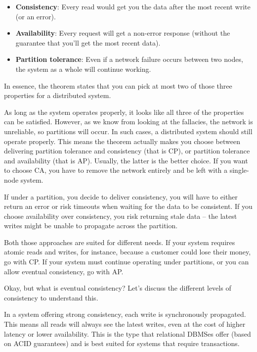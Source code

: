 \begin{itemize}
\item 
\textbf{Consistency}: Every read would get you the data after the most recent write (or an error).

\item 
\textbf{Availability}: Every request will get a non-error response (without the guarantee that you'll get the most recent data).

\item 
\textbf{Partition tolerance}: Even if a network failure occurs between two nodes, the system as a whole will continue working.
\end{itemize}

In essence, the theorem states that you can pick at most two of those three properties for a distributed system.

As long as the system operates properly, it looks like all three of the properties can be satisfied. However, as we know from looking at the fallacies, the network is unreliable, so partitions will occur. In such cases, a distributed system should still operate properly. This means the theorem actually makes you choose between delivering partition tolerance and consistency (that is CP), or partition tolerance and availability (that is AP). Usually, the latter is the better choice. If you want to choose CA, you have to remove the network entirely and be left with a single-node system.

If under a partition, you decide to deliver consistency, you will have to either return an error or risk timeouts when waiting for the data to be consistent. If you choose availability over consistency, you risk returning stale data – the latest writes might be unable to propagate across the partition.

Both those approaches are suited for different needs. If your system requires atomic reads and writes, for instance, because a customer could lose their money, go with CP. If your system must continue operating under partitions, or you can allow eventual consistency, go with AP.

Okay, but what is eventual consistency? Let's discuss the different levels of consistency to understand this.

In a system offering strong consistency, each write is synchronously propagated. This means all reads will always see the latest writes, even at the cost of higher latency or lower availability. This is the type that relational DBMSes offer (based on ACID guarantees) and is best suited for systems that require transactions. 

